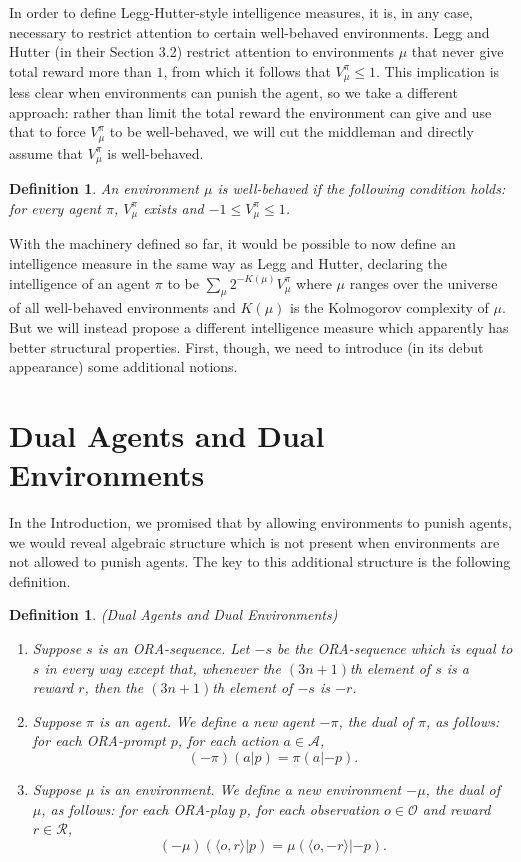 \documentclass{article}
\newtheorem{definition}[theorem]{Definition}
\begin{document}
In order to define Legg-Hutter-style
intelligence measures, it is, in any case, necessary to restrict attention to
certain well-behaved environments. Legg and Hutter (in their Section 3.2)
restrict attention to environments $\mu$ that never give total reward more than $1$,
from which it follows that $V^\pi_\mu\leq 1$. This implication is less clear
when environments can punish the agent, so we take a different approach:
rather than limit the total reward the environment can give and use that to
force $V^\pi_\mu$ to be well-behaved, we will cut the middleman and
directly assume that $V^\pi_\mu$ is well-behaved.

\begin{definition}
    An environment $\mu$ is \emph{well-behaved} if the following
    condition holds: for every agent $\pi$, $V^\pi_\mu$ exists and
    $-1\leq V^\pi_\mu\leq 1$.
\end{definition}

With the machinery defined so far, it would be possible to now define an
intelligence measure in the same way as Legg and Hutter,
declaring the intelligence of an agent $\pi$ to be
$\sum_{\mu} 2^{-K(\mu)}V^\pi_\mu$ where $\mu$ ranges over the universe
of all well-behaved environments and $K(\mu)$ is the Kolmogorov complexity
of $\mu$. But we will instead propose a different intelligence measure
which apparently has better structural properties. First, though, we need
to introduce (in its debut appearance) some additional notions.

\section{Dual Agents and Dual Environments}

In the Introduction, we promised that by allowing environments to punish agents,
we would reveal algebraic structure which is not present when environments are
not allowed to punish agents. The key to this additional structure is the following
definition.

\begin{definition}
(Dual Agents and Dual Environments)
\begin{enumerate}
    \item
    Suppose $s$ is an ORA-sequence. Let $-s$
    be the ORA-sequence which is equal to $s$ in every way except that,
    whenever the $(3n+1)$th element of $s$ is a reward $r$,
    then the $(3n+1)$th element of $-s$ is $-r$.
    \item
    Suppose $\pi$ is an agent.
    We define a new agent $-\pi$, the \emph{dual} of $\pi$,
    as follows:
    for each ORA-prompt $p$, for each action $a\in\mathcal A$,
    \[(-\pi)(a|p)=\pi(a|{-p}).\]
    \item
    Suppose $\mu$ is an environment.
    We define a new environment $-\mu$, the \emph{dual} of $\mu$,
    as follows:
    for each ORA-play $p$, for each observation $o\in\mathcal O$
    and reward $r\in\mathcal R$,
    \[(-\mu)(\langle o,r\rangle|p)=\mu(\langle o,-r\rangle|{-p}).\]
\end{enumerate}
\end{definition}
\end{document}

